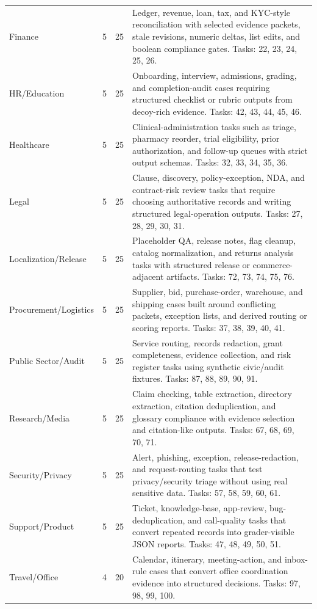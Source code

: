 \documentclass[11pt]{article}
\begin{document}
\begin{longtable}{L{0.18\textwidth}L{0.09\textwidth}L{0.13\textwidth}L{0.52\textwidth}}
Finance & 5 & 25 & Ledger, revenue, loan, tax, and KYC-style reconciliation with selected evidence packets, stale revisions, numeric deltas, list edits, and boolean compliance gates. Tasks: 22, 23, 24, 25, 26. \\
HR/Education & 5 & 25 & Onboarding, interview, admissions, grading, and completion-audit cases requiring structured checklist or rubric outputs from decoy-rich evidence. Tasks: 42, 43, 44, 45, 46. \\
Healthcare & 5 & 25 & Clinical-administration tasks such as triage, pharmacy reorder, trial eligibility, prior authorization, and follow-up queues with strict output schemas. Tasks: 32, 33, 34, 35, 36. \\
Legal & 5 & 25 & Clause, discovery, policy-exception, NDA, and contract-risk review tasks that require choosing authoritative records and writing structured legal-operation outputs. Tasks: 27, 28, 29, 30, 31. \\
Localization/Release & 5 & 25 & Placeholder QA, release notes, flag cleanup, catalog normalization, and returns analysis tasks with structured release or commerce-adjacent artifacts. Tasks: 72, 73, 74, 75, 76. \\
Procurement/Logistics & 5 & 25 & Supplier, bid, purchase-order, warehouse, and shipping cases built around conflicting packets, exception lists, and derived routing or scoring reports. Tasks: 37, 38, 39, 40, 41. \\
Public Sector/Audit & 5 & 25 & Service routing, records redaction, grant completeness, evidence collection, and risk register tasks using synthetic civic/audit fixtures. Tasks: 87, 88, 89, 90, 91. \\
Research/Media & 5 & 25 & Claim checking, table extraction, directory extraction, citation deduplication, and glossary compliance with evidence selection and citation-like outputs. Tasks: 67, 68, 69, 70, 71. \\
Security/Privacy & 5 & 25 & Alert, phishing, exception, release-redaction, and request-routing tasks that test privacy/security triage without using real sensitive data. Tasks: 57, 58, 59, 60, 61. \\
Support/Product & 5 & 25 & Ticket, knowledge-base, app-review, bug-deduplication, and call-quality tasks that convert repeated records into grader-visible JSON reports. Tasks: 47, 48, 49, 50, 51. \\
Travel/Office & 4 & 20 & Calendar, itinerary, meeting-action, and inbox-rule cases that convert office coordination evidence into structured decisions. Tasks: 97, 98, 99, 100. \\
\bottomrule
\end{longtable}
\endgroup
\end{document}
